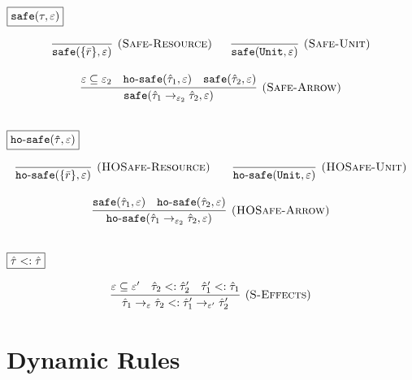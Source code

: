 \documentclass{llncs}
\newcommand{\keywadj}[1]{\mathtt{#1}}
\newcommand{\kwa}[1]{\keywadj{ #1 }}
\newcommand{\hyphen}{\hbox{-}}
\begin{document}
\noindent
$\fbox{$\kwa{safe(\tau, \varepsilon)}$}$

\[
\begin{array}{c}

\infer[\textsc{(Safe-Resource)}]
	{\kwa{safe}(\{ \bar r \}, \varepsilon)}
	{}
~~~~~
\infer[\textsc{(Safe-Unit)}]
	{\kwa{safe}(\kwa{Unit}, \varepsilon)}
	{} \\[3ex]

\infer[\textsc{(Safe-Arrow)}]
	{\kwa{safe}(\hat \tau_1 \rightarrow_{\varepsilon_2} \hat \tau_2, \varepsilon)}
	{\varepsilon \subseteq \varepsilon_2 & \kwa{ho \hyphen safe}(\hat \tau_1, \varepsilon) & \kwa{safe}(\hat \tau_2, \varepsilon)} \\[3ex]

\end{array}
\]

\noindent
$\fbox{$\kwa{ho \hyphen safe(\hat \tau, \varepsilon)}$}$

\[
\begin{array}{c}

\infer[\textsc{(HOSafe-Resource)}]
	{ \kwa{ho \hyphen safe}( \{ \bar r \}, \varepsilon)} 
	{}
	~~~~~~
\infer[\textsc{(HOSafe-Unit)}]
	{ \kwa{ho \hyphen safe}( \kwa{Unit}, \varepsilon)} 
	{}\\[3ex]

\infer[\textsc{(HOSafe-Arrow)}]
	{ \kwa{ho \hyphen safe}( \hat \tau_1 \rightarrow_{\varepsilon_2} \hat \tau_2, \varepsilon ) }
	{ \kwa{safe}(\hat \tau_1, \varepsilon)  & \kwa{ho \hyphen safe}(\hat \tau_2, \varepsilon) }\\[3ex]

\end{array}
\]

\noindent
$\fbox{$\hat \tau <: \hat \tau$}$

\[
\begin{array}{c}

\infer[(\textsc{S-Effects})]
	{\hat \tau_1 \rightarrow_{\varepsilon} \hat \tau_2 <: \hat \tau_1' \rightarrow_{\varepsilon'} \hat \tau_2'}
	{\varepsilon \subseteq \varepsilon' & \hat \tau_2 <: \hat \tau_2' & \hat \tau_1' <: \hat \tau_1}

\end{array}
\]

\section{Dynamic Rules}

\noindent
{}
\end{document}
